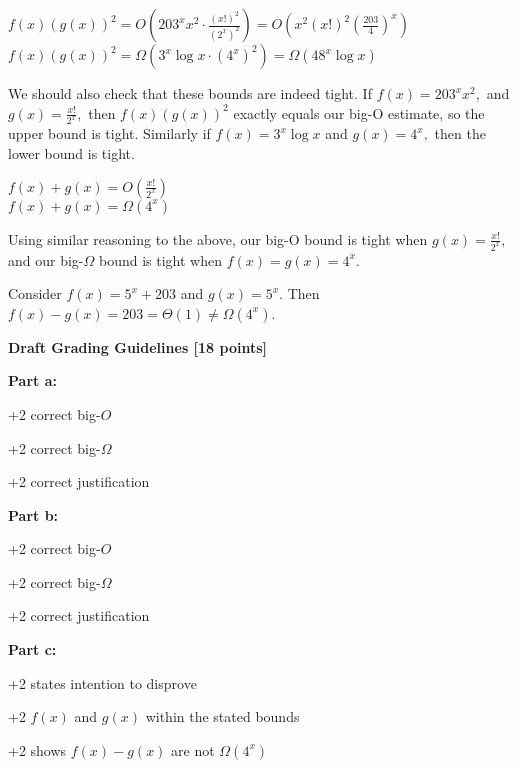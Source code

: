 \documentclass[12pt]{exam}
\begin{document}
\begin{solution}
\begin{qparts}
    \item $f(x)(g(x))^2=O(203^xx^2\cdot\frac{(x!)^2}{(2^x)^2})=O(x^2(x!)^2(\frac{203}{4})^x)$\\
    $f(x)(g(x))^2=\Omega(3^x\log x\cdot(4^x)^2)=\Omega(48^x\log x)$

    We should also check that these bounds are indeed tight. If $f(x)=203^x x^2,$ and $g(x)=\frac{x!}{2^x},$ then $f(x)(g(x))^2$ exactly equals our big-O estimate, so the upper bound is tight. Similarly if $f(x)=3^x\log x$ and $g(x)=4^x,$ then the lower bound is tight.
    
    \item $f(x)+g(x)=O(\frac{x!}{2^x})$\\
    $f(x)+g(x)=\Omega(4^x)$

    Using similar reasoning to the above, our big-O bound is tight when $g(x)=\frac{x!}{2^x},$ and our big-$\Omega$ bound is tight when $f(x)=g(x)=4^x.$
    
    \item Consider $f(x)=5^x+203$ and $g(x)=5^x$. Then $f(x)-g(x)=203=\Theta(1)\neq\Omega(4^x)$.
\end{qparts}

\textbf{Draft Grading Guidelines [18 points]}

\textbf{Part a:}
\begin{guidelines}
    \item +2 correct big-$O$
    \item +2 correct big-$\Omega$
    \item +2 correct justification
\end{guidelines}
\textbf{Part b:}
\begin{guidelines}
    \item +2 correct big-$O$
    \item +2 correct big-$\Omega$
    \item +2 correct justification
\end{guidelines}
\textbf{Part c:}
\begin{guidelines}
    \item +2 states intention to disprove
    \item +2 $f(x)$ and $g(x)$ within the stated bounds
    \item +2 shows $f(x)-g(x)$ are not $\Omega(4^x)$
\end{guidelines}
\end{solution}
\end{document}
